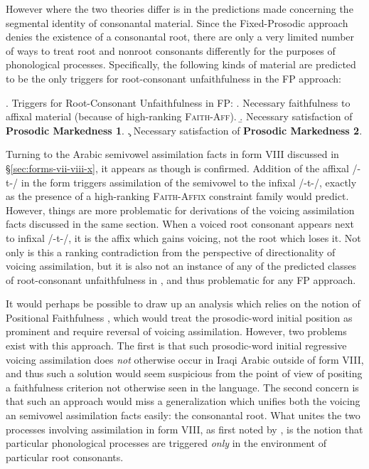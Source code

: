 \documentclass[12pt,twoside,letterpaper]{article}
\begin{document}
However where the two theories differ is in the predictions made concerning the segmental identity of consonantal material. Since the Fixed-Prosodic approach denies the existence of a consonantal root, there are only a very limited number of ways to treat root and nonroot consonants differently for the purposes of phonological processes. Specifically, the following kinds of material are predicted to be the only triggers for root-consonant unfaithfulness in the FP approach:

\ex. Triggers for Root-Consonant Unfaithfulness in FP:
\a. Necessary faithfulness to affixal material (because of high-ranking \textsc{Faith-Aff}).
\b. Necessary satisfaction of \textbf{Prosodic Markedness 1}.
\c. Necessary satisfaction of \textbf{Prosodic Markedness 2}.

Turning to the Arabic semivowel assimilation facts in form VIII discussed in \S{\ref{sec:forms-vii-viii-x}}, it appears as though \Last[a] is confirmed. Addition of the affixal /-t-/ in the {\em {}} form triggers assimilation of the semivowel to the infixal /-t-/, exactly as the presence of a high-ranking \textsc{Faith-Affix} constraint family would predict. However, things are more problematic for derivations of the voicing assimilation facts discussed in the same section. When a voiced root consonant appears next to infixal /-t-/, it is the affix which gains voicing, not the root which loses it. Not only is this a ranking contradiction from the perspective of directionality of voicing assimilation, but it is also not an instance of any of the predicted classes of root-consonant unfaithfulness in \Last, and thus problematic for any FP approach.

It would perhaps be possible to draw up an analysis which relies on the notion of Positional Faithfulness \citep{beckman98}, which would treat the prosodic-word initial position as prominent and require reversal of voicing assimilation. However, two problems exist with this approach. The first is that such prosodic-word initial regressive voicing assimilation does \emph{not} otherwise occur in Iraqi Arabic outside of form VIII, and thus such a solution would seem suspicious from the point of view of positing a faithfulness criterion not otherwise seen in the language. The second concern is that such an approach would miss a generalization which unifies both the voicing an semivowel assimilation facts easily: the consonantal root. What unites the two processes involving assimilation in form VIII, as first noted by \cite{mccarthy79}, is the notion that particular phonological processes are triggered \emph{only} in the environment of particular root consonants. 
\end{document}
